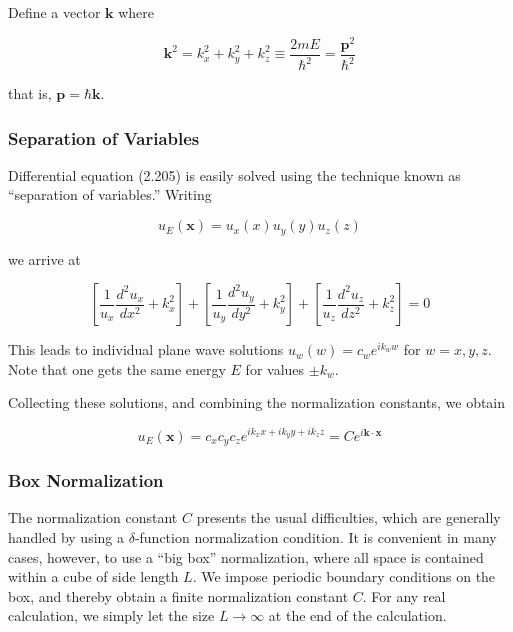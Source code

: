 \documentclass[11pt,a4paper]{article}
\begin{document}
Define a vector $\mathbf{k}$ where

\begin{equation}
\mathbf{k}^2 = k_x^2 + k_y^2 + k_z^2 \equiv \frac{2mE}{\hbar^2} = \frac{\mathbf{p}^2}{\hbar^2}
\tag{2.206}
\end{equation}

that is, $\mathbf{p} = \hbar\mathbf{k}$.

\subsubsection{Separation of Variables}

Differential equation (2.205) is easily solved using the technique known as ``separation of variables.'' Writing

\begin{equation}
u_E(\mathbf{x}) = u_x(x)u_y(y)u_z(z)
\tag{2.207}
\end{equation}

we arrive at

\begin{equation}
\left[\frac{1}{u_x}\frac{d^2u_x}{dx^2} + k_x^2\right] + \left[\frac{1}{u_y}\frac{d^2u_y}{dy^2} + k_y^2\right] + \left[\frac{1}{u_z}\frac{d^2u_z}{dz^2} + k_z^2\right] = 0
\tag{2.208}
\end{equation}

This leads to individual plane wave solutions $u_w(w) = c_w e^{ik_w w}$ for $w = x, y, z$. Note that one gets the same energy $E$ for values $\pm k_w$.

Collecting these solutions, and combining the normalization constants, we obtain

\begin{equation}
u_E(\mathbf{x}) = c_x c_y c_z e^{ik_x x + ik_y y + ik_z z} = Ce^{i\mathbf{k}\cdot\mathbf{x}}
\tag{2.209}
\end{equation}

\subsubsection{Box Normalization}

The normalization constant $C$ presents the usual difficulties, which are generally handled by using a $\delta$-function normalization condition. It is convenient in many cases, however, to use a ``big box'' normalization, where all space is contained within a cube of side length $L$. We impose periodic boundary conditions on the box, and thereby obtain a finite normalization constant $C$. For any real calculation, we simply let the size $L \to \infty$ at the end of the calculation.
\end{document}
